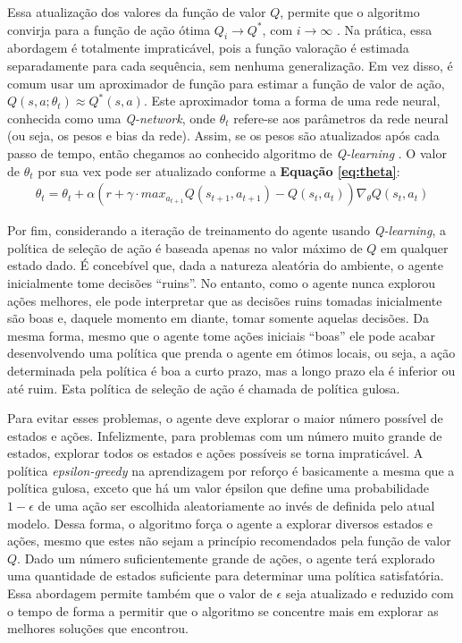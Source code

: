 Essa atualização dos valores da função de valor $Q$, permite que o algoritmo convirja para a função de ação ótima $Q_i \rightarrow Q^*$, com $i\rightarrow\infty$ \cite{sutton-barto-rl-intro}. Na prática, essa abordagem é totalmente impraticável, pois a função valoração é estimada separadamente para cada sequência, sem nenhuma generalização. Em vez disso, é comum usar um aproximador de função para estimar a função de valor de ação, $Q(s,a;\theta_t) \approx Q^*(s,a)$. Este aproximador toma a forma de uma rede neural, conhecida como uma \textit{Q-network}, onde $\theta_t$ refere-se aos parâmetros da rede neural (ou seja, os pesos e bias da rede). Assim, se os pesos são atualizados após cada passo de tempo, então chegamos ao conhecido algoritmo de \textit{Q-learning} \cite{Watkins-Dayan-Qlearning}. O valor de $\theta_t$ por sua vex pode ser atualizado conforme a \textbf{Equação \ref{eq:theta}}:
\begin{eqnarray}
  \theta_t = \theta_t + \alpha(r + \gamma\cdot max_{a_{t+1}}Q(s_{t+1},a_{t+1}) - Q(s_t,a_t))\nabla_\theta Q(s_t,a_t)
  \label{eq:theta}
\end{eqnarray}

Por fim, considerando a iteração de treinamento do agente usando \textit{Q-learning}, a política de seleção de ação é baseada apenas no valor máximo de $Q$ em qualquer estado dado. É concebível que, dada a natureza aleatória do ambiente, o agente inicialmente tome decisões “ruins”. No entanto, como o agente nunca explorou ações melhores, ele pode interpretar que as decisões ruins tomadas inicialmente são boas e, daquele momento em diante, tomar somente aquelas decisões. Da mesma forma, mesmo que o agente tome ações iniciais ``boas'' ele pode acabar desenvolvendo uma política que prenda o agente em ótimos locais, ou seja, a ação determinada pela política é boa a curto prazo, mas a longo prazo ela é inferior ou até ruim. Esta política de seleção de ação é chamada de política gulosa.

Para evitar esses problemas, o agente deve explorar o maior número possível de estados e ações. Infelizmente, para problemas com um número muito grande de estados, explorar todos os estados e ações possíveis se torna impraticável. A política \textit{epsilon-greedy} na aprendizagem por reforço é basicamente a mesma que a política gulosa, exceto que há um valor épsilon que define uma probabilidade $1-\epsilon$ de uma ação ser escolhida aleatoriamente ao invés de definida pelo atual modelo. Dessa forma, o algoritmo força o agente a explorar diversos estados e ações, mesmo que estes não sejam a princípio recomendados pela função de valor $Q$. Dado um número suficientemente grande de ações, o agente terá explorado uma quantidade de estados suficiente para determinar uma política satisfatória. Essa abordagem permite também que o valor de $\epsilon$ seja atualizado e reduzido com o tempo de forma a permitir que o algoritmo se concentre mais em explorar as melhores soluções que encontrou. 

